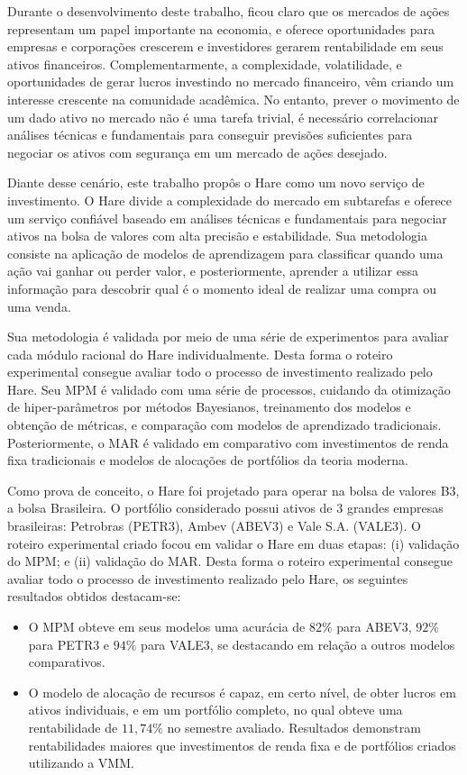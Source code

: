 \label{cap_conc}


Durante o desenvolvimento deste trabalho, ficou claro que os mercados de ações representam um papel importante na economia, e oferece oportunidades para empresas e corporações crescerem e investidores gerarem rentabilidade em seus ativos financeiros. Complementarmente, a complexidade, volatilidade, e oportunidades de gerar lucros investindo no mercado financeiro, vêm criando um interesse crescente na comunidade acadêmica. No entanto, prever o movimento de um dado ativo no mercado não é uma tarefa trivial, é necessário correlacionar análises técnicas e fundamentais para conseguir previsões suficientes para negociar os ativos com segurança em um mercado de ações desejado. 

Diante desse cenário, este trabalho propôs o Hare como um novo serviço de investimento. O Hare divide a complexidade do mercado em subtarefas e oferece um serviço confiável baseado em análises técnicas e fundamentais para negociar ativos na bolsa de valores com alta precisão e estabilidade. Sua metodologia consiste na aplicação de modelos de aprendizagem para classificar quando uma ação vai ganhar ou perder valor, e posteriormente, aprender a utilizar essa informação para descobrir qual é o momento ideal de realizar uma compra ou uma venda.


Sua metodologia é validada por meio de uma série de experimentos para avaliar cada módulo racional do Hare individualmente. Desta forma o roteiro experimental consegue avaliar todo o processo de investimento realizado pelo Hare. Seu \acrshort{MPM} é validado com uma série de processos, cuidando da otimização de hiper-parâmetros por métodos Bayesianos, treinamento dos modelos e obtenção de métricas, e comparação com modelos de aprendizado tradicionais. Posteriormente, o \acrshort{MAR} é validado em comparativo com investimentos de renda fixa tradicionais e modelos de alocações de portfólios da teoria moderna.


Como prova de conceito, o Hare foi projetado para operar na bolsa de valores B3, a bolsa Brasileira. O portfólio considerado possui ativos de 3 grandes empresas brasileiras: Petrobras (PETR3), Ambev (ABEV3) e Vale S.A. (VALE3). O roteiro experimental criado focou em validar o Hare em duas etapas: (i) validação do \acrshort{MPM}; e (ii) validação do \acrfull{MAR}. Desta forma o roteiro experimental consegue avaliar todo o processo de investimento realizado pelo Hare, os seguintes resultados obtidos destacam-se:
\begin{itemize}
    \item O \acrshort{MPM} obteve em seus modelos uma acurácia de $82\%$ para ABEV3, $92\%$ para PETR3 e $94\%$ para VALE3, se destacando em relação a outros modelos comparativos.
    \item O modelo de alocação de recursos é capaz, em certo nível, de obter lucros em ativos individuais, e em um portfólio completo, no qual obteve uma rentabilidade de $11,74\%$ no semestre avaliado. Resultados demonstram rentabilidades maiores que investimentos de renda fixa e de portfólios criados utilizando a \acrlong{VMM}.
\end{itemize}


